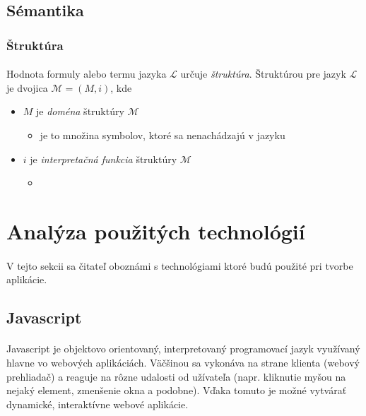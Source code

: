 \subsection{Sémantika}
\subsubsection{Štruktúra}
\paragraph{}
Hodnota formuly alebo termu jazyka $\mathcal{L}$ určuje \emph{štruktúra}. Štruktúrou pre jazyk $\mathcal{L}$ je dvojica $\mathcal{M} = (M, i)$, kde
\begin{itemize}
	\item $M$ je \emph{doména} štruktúry $\mathcal{M}$
	\begin{itemize}
		\item je to množina symbolov, ktoré sa nenachádzajú v jazyku
	\end{itemize}
	\item $i$ je \emph{interpretačná funkcia} štruktúry $\mathcal{M}$
	\begin{itemize}
		\item 
	\end{itemize}
\end{itemize}
\paragraph{}




\section{Analýza použitých technológií}
\paragraph{}
V tejto sekcii sa čitateľ oboznámi s technológiami ktoré budú použité pri tvorbe aplikácie. 
\subsection{Javascript}
\paragraph{}
Javascript je objektovo orientovaný, interpretovaný programovací jazyk využívaný hlavne vo webových aplikáciách. Väčšinou sa vykonáva na strane klienta (webový prehliadač) a reaguje na rôzne udalosti od užívateľa (napr. kliknutie myšou na nejaký element, zmenšenie okna a podobne). Vďaka tomuto je možné vytvárať dynamické, interaktívne webové aplikácie.
